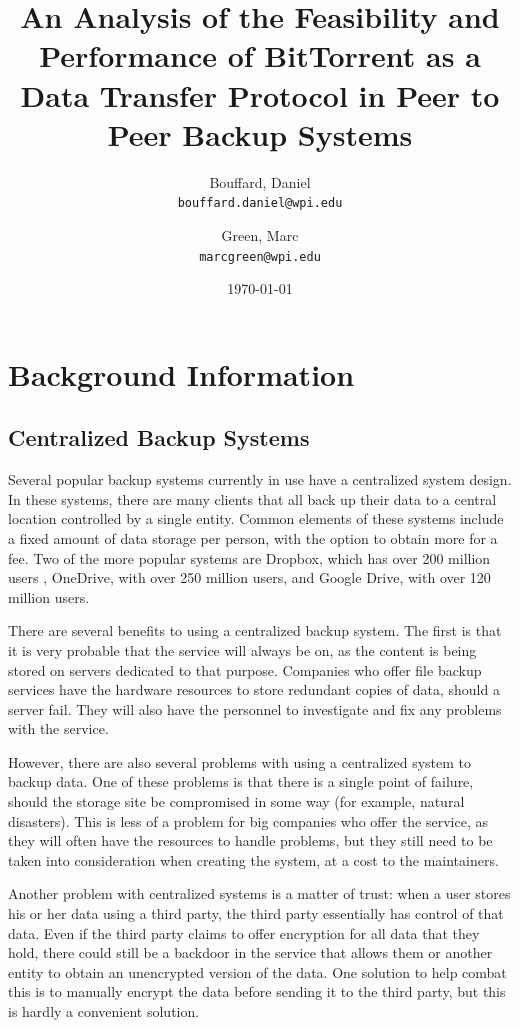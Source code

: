 \documentclass[a4paper]{article}
\author{
  Bouffard, Daniel\\
  \texttt{bouffard.daniel@wpi.edu}
  \and
  Green, Marc\\
  \texttt{marcgreen@wpi.edu}
}
\title{An Analysis of the Feasibility and Performance of BitTorrent as a Data Transfer Protocol in Peer to Peer Backup Systems}
\date{\today}
\begin{document}
\maketitle

\section{Background Information}
\subsection{Centralized Backup Systems}
Several popular backup systems currently in use have a centralized system design. In these systems, there are many clients that all back up their data to a central location controlled by a single entity. Common elements of these systems include a fixed amount of data storage per person, with the option to obtain more for a fee. Two of the more popular systems are Dropbox, which has over 200 million users \cite{dropboxusers}, OneDrive, with over 250 million users, and Google Drive, with over 120 million users.

There are several benefits to using a centralized backup system. The first is that it is very probable that the service will always be on, as the content is being stored on servers dedicated to that purpose. Companies who offer file backup services have the hardware resources to store redundant copies of data, should a server fail. They will also have the personnel to investigate and fix any problems with the service.

However, there are also several problems with using a centralized system to backup data. One of these problems is that there is a single point of failure, should the storage site be compromised in some way (for example, natural disasters). This is less of a problem for big companies who offer the service, as they will often have the resources to handle problems, but they still need to be taken into consideration when creating the system, at a cost to the maintainers.

Another problem with centralized systems is a matter of trust: when a user stores his or her data using a third party, the third party essentially has control of that data. Even if the third party claims to offer encryption for all data that they hold, there could still be a backdoor in the service that allows them or another entity to obtain an unencrypted version of the data. One solution to help combat this is to manually encrypt the data before sending it to the third party, but this is hardly a convenient solution.
\end{document}
